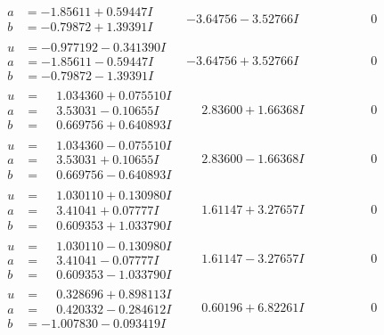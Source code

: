 \documentclass[1p]{elsarticle_modified}
\theoremstyle{definition}
\begin{document}
$$\begin{array}{c|c|c}
\begin{aligned}
a &= -1.85611 + 0.59447 I \\
b &= -0.79872 + 1.39391 I\end{aligned}
 & -3.64756 - 3.52766 I & \phantom{-0.000000 } 0 \\ \hline\begin{aligned}
u &= -0.977192 - 0.341390 I \\
a &= -1.85611 - 0.59447 I \\
b &= -0.79872 - 1.39391 I\end{aligned}
 & -3.64756 + 3.52766 I & \phantom{-0.000000 } 0 \\ \hline\begin{aligned}
u &= \phantom{-}1.034360 + 0.075510 I \\
a &= \phantom{-}3.53031 - 0.10655 I \\
b &= \phantom{-}0.669756 + 0.640893 I\end{aligned}
 & \phantom{-}2.83600 + 1.66368 I & \phantom{-0.000000 } 0 \\ \hline\begin{aligned}
u &= \phantom{-}1.034360 - 0.075510 I \\
a &= \phantom{-}3.53031 + 0.10655 I \\
b &= \phantom{-}0.669756 - 0.640893 I\end{aligned}
 & \phantom{-}2.83600 - 1.66368 I & \phantom{-0.000000 } 0 \\ \hline\begin{aligned}
u &= \phantom{-}1.030110 + 0.130980 I \\
a &= \phantom{-}3.41041 + 0.07777 I \\
b &= \phantom{-}0.609353 + 1.033790 I\end{aligned}
 & \phantom{-}1.61147 + 3.27657 I & \phantom{-0.000000 } 0 \\ \hline\begin{aligned}
u &= \phantom{-}1.030110 - 0.130980 I \\
a &= \phantom{-}3.41041 - 0.07777 I \\
b &= \phantom{-}0.609353 - 1.033790 I\end{aligned}
 & \phantom{-}1.61147 - 3.27657 I & \phantom{-0.000000 } 0 \\ \hline\begin{aligned}
u &= \phantom{-}0.328696 + 0.898113 I \\
a &= \phantom{-}0.420332 - 0.284612 I \\
b &= -1.007830 - 0.093419 I\end{aligned}
 & \phantom{-}0.60196 + 6.82261 I & \phantom{-0.000000 } 0 \\ \hline\begin{aligned}

\end{aligned}
\end{array}$$
\end{document}
